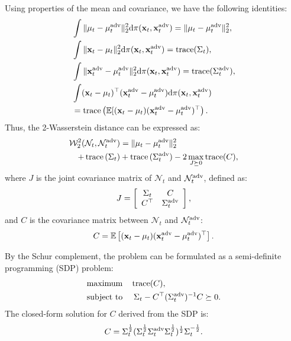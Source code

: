 Using properties of the mean and covariance, we have the following identities:
\begin{align*}
    &\int \|\mu_t-\mu_t^{\adv}\|_2^2 \text{d}\pi(\mathbf{x}_t, \mathbf{x}_t^{\adv}) = \|\mu_t-\mu_t^{\adv}\|_2^2, \\
    &\int \|\mathbf{x}_t-\mu_t\|_2^2 \text{d}\pi(\mathbf{x}_t, \mathbf{x}_t^{\adv}) = \trac(\Sigma_t), \\
    &\int \|\mathbf{x}_t^{\adv}-\mu_t^{\adv}\|_2^2 \text{d}\pi(\mathbf{x}_t, \mathbf{x}_t^{\adv}) = \trac(\Sigma_t^{\adv}), \\
    &\int (\mathbf{x}_t-\mu_t)^\top(\mathbf{x}_t^{\adv}-\mu_t^{\adv}) \text{d}\pi(\mathbf{x}_t, \mathbf{x}_t^{\adv}) \\
    &=\trac\left(\mathbb{E}[(\mathbf{x}_t-\mu_t)(\mathbf{x}_t^{\adv}-\mu_t^{\adv})^\top\right).
\end{align*}
Thus, the 2-Wasserstein distance can be expressed as:
\begin{equation}
\begin{aligned}
    \mathcal{W}_2^2(\mathcal{N}_t, \mathcal{N}_t^{\adv})
    &=\|\mu_t-\mu_t^{\adv}\|_2^2 \\
    + \trac{(\Sigma_t)} &+ \trac{(\Sigma_t^{\adv})}
    -2\max_{J \succeq 0} \trac(C),
\end{aligned}
\end{equation}
where $J$ is the joint covariance matrix of $\mathcal{N}_t$ and $\mathcal{N}_t^{\adv}$, defined as:
\begin{align*}
J = \left[
\begin{array}{cc}
    \Sigma_t & C \\
    C^\top   & \Sigma_t^{\adv}
\end{array}
\right],
\end{align*}
and $C$ is the covariance matrix between $\mathcal{N}_t$ and $\mathcal{N}_t^{\adv}$:
\begin{align*}
C = \mathbb{E}
\left[
(\mathbf{x}_t-\mu_t)(\mathbf{x}_t^{\adv}-\mu_t^{\adv})^{\top}
\right].
\end{align*}

By the Schur complement, the problem can be formulated as a semi-definite programming (SDP) problem:
\begin{equation}
\begin{aligned}
&\text{maximum} \quad \trac(C), \\
&\text{subject to } \quad
\Sigma_t - C^\top (\Sigma_t^{\adv})^{-1} C \succeq 0.
\end{aligned}
\end{equation}
The closed-form solution for $C$ derived from the SDP is:
\begin{equation*}
    C=
    \Sigma_t^{\frac{1}{2}}
    (\Sigma_t^{\frac{1}{2}}\Sigma_t^{\adv}\Sigma_t^{\frac{1}{2}})^\frac{1}{2}
    \Sigma_t^{-\frac{1}{2}}.
\end{equation*}

